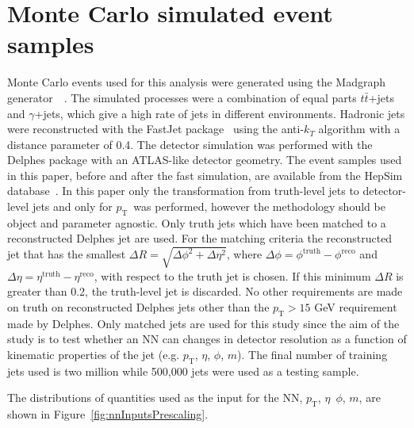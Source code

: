 \documentclass[showpacs,showkeys,preprint,prd,nofootinbib,linenumbers,12pt,superscriptaddress]{revtex4-1}
\def\pt{\ensuremath{p_{\mathrm{T}}}}
\begin{document}
\section{Monte Carlo simulated event samples}

Monte Carlo events used for this analysis were generated using the Madgraph generator~~\cite{Alwall:2014hca}. The simulated processes were a combination of equal parts $t\bar{t}$+jets and $\gamma$+jets, which give a high rate of jets in different environments. 
Hadronic jets were reconstructed with the {\sc FastJet} package~\cite{Fastjet} using the anti-$k_T$ algorithm \cite{Cacciari:2008gp} with a distance parameter of 0.4. The detector simulation was performed with the Delphes package \cite{deFavereau:2013fsa} with an ATLAS-like detector geometry. 
The event samples used in this paper, before and after the fast simulation, are available from the HepSim database~\cite{Chekanov:2014fga}. In this paper only the transformation from truth-level jets to detector-level jets and only for \pt\ was performed, however the methodology should be object and parameter agnostic. Only truth jets which have been matched to a reconstructed Delphes jet are used. For the matching criteria the reconstructed jet that has the smallest $\Delta R=\sqrt{\Delta\phi^2+\Delta\eta^2}$, where $\Delta\phi=\phi^{\text{truth}}-\phi^{\text{reco}}$ and $\Delta\eta=\eta^{\text{truth}}-\eta^{\text{reco}}$, with respect to the truth jet is chosen. If this minimum $\Delta R$ is greater than 0.2, the truth-level jet is discarded. No other requirements are made on truth on reconstructed Delphes jets other than the $\pt>15$ GeV requirement made by Delphes. Only matched jets are used for this study since the aim of the study is to test whether an NN can changes in detector resolution as a function of kinematic properties of the jet (e.g. $\pt$, $\eta$, $\phi$, $m$). 
The final number of training jets used is two million while 500,000 jets were used as a testing sample.  

The distributions of quantities used as the input for the NN, \pt, $\eta$\, $\phi$, $m$, are shown in Figure~\ref{fig:nnInputsPrescaling}.
\end{document}
